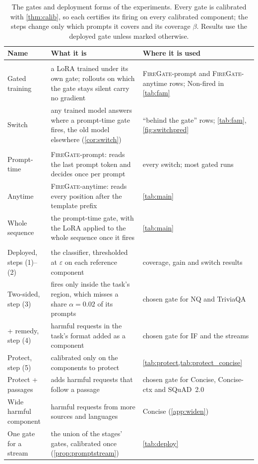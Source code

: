 \documentclass{article}
\theoremstyle{plain}
\theoremstyle{definition}
\theoremstyle{remark}
\newcommand{\methodp}{\textsc{FireGate}-prompt}
\newcommand{\methoda}{\textsc{FireGate}-anytime}
\begin{document}
\begin{table}[t]
\centering
\scriptsize
\setlength{\tabcolsep}{3pt}
\caption{The gates and deployment forms of the experiments. Every gate is calibrated with \cref{thm:calib}, so each
certifies its firing on every calibrated component; the steps change only which prompts it covers and its coverage
$\beta$. Results use the deployed gate unless marked otherwise.}
\label{tab:variants}
\begin{tabular}{>{\raggedright\arraybackslash}p{2.7cm} >{\raggedright\arraybackslash}p{6.9cm} >{\raggedright\arraybackslash}p{4.5cm}}
\toprule
Name & What it is & Where it is used \\
\midrule
\multicolumn{3}{l}{\emph{How the update is deployed}} \\
Gated training & a LoRA trained under its own gate; rollouts on which the gate stays silent carry no gradient &
\methodp{} and \methoda{} rows; Non-fired in \cref{tab:fam} \\
Switch & any trained model answers where a prompt-time gate fires, the old model elsewhere (\cref{cor:switch}) &
``behind the gate'' rows; \cref{tab:fam}, \cref{fig:switchpred} \\
\multicolumn{3}{l}{\emph{Where the gate reads}} \\
Prompt-time & \methodp{}: reads the last prompt token and decides once per prompt & every switch; most gated runs \\
Anytime & \methoda{}: reads every position after the template prefix & \cref{tab:main} \\
Whole sequence & the prompt-time gate, with the LoRA applied to the whole sequence once it fires & \cref{tab:main} \\
\multicolumn{3}{l}{\emph{Which prompts it covers (steps of \cref{sec:method})}} \\
Deployed, steps (1)--(2) & the classifier, thresholded at $\varepsilon$ on each reference component & coverage, gain and
switch results \\
Two-sided, step (3) & fires only inside the task's region, which misses a share $\alpha=0.02$ of its prompts & chosen
gate for NQ and TriviaQA \\
+ remedy, step (4) & harmful requests in the task's format added as a component & chosen gate for IF and the streams \\
Protect, step (5) & calibrated only on the components to protect & \cref{tab:protect,tab:protect_concise} \\
Protect + passages & adds harmful requests that follow a passage & chosen gate for Concise, Concise-ctx and
SQuAD~2.0 \\
Wide harmful component & harmful requests from more sources and languages & Concise (\cref{app:widen}) \\
One gate for a stream & the union of the stages' gates, calibrated once (\cref{prop:promptstream}) & \cref{tab:deploy} \\
\bottomrule
\end{tabular}
\end{table}
\end{document}

